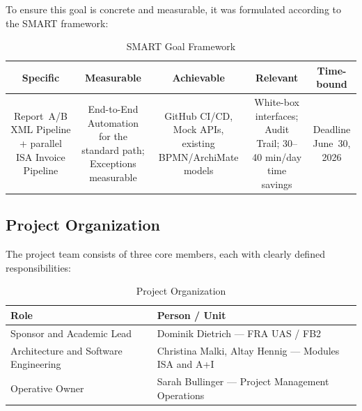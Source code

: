 \documentclass[11pt,a4paper]{article}
\begin{document}
To ensure this goal is concrete and measurable, it was formulated according to the SMART framework:

\begin{table}[ht]
\centering
\caption{SMART Goal Framework}
\begin{tabular}{@{}ccccc@{}}
\toprule
\textbf{Specific} & \textbf{Measurable} & \textbf{Achievable} & \textbf{Relevant} & \textbf{Time-bound} \\
\midrule
\begin{minipage}[t]{0.16\textwidth}\small Report~A/B XML Pipeline + parallel ISA Invoice Pipeline\end{minipage} &
\begin{minipage}[t]{0.16\textwidth}\small End-to-End Automation for the standard path; Exceptions measurable\end{minipage} &
\begin{minipage}[t]{0.16\textwidth}\small GitHub CI/CD, Mock APIs, existing BPMN/ArchiMate models\end{minipage} &
\begin{minipage}[t]{0.16\textwidth}\small White-box interfaces; Audit Trail; 30--40 min/day time savings\end{minipage} &
\begin{minipage}[t]{0.16\textwidth}\small Deadline June~30, 2026\end{minipage} \\
\bottomrule
\end{tabular}
\end{table}

\subsection{Project Organization}

The project team consists of three core members, each with clearly defined responsibilities:

\begin{table}[ht]
\centering
\caption{Project Organization}
\begin{tabular}{@{}p{}p{}@{}}
\toprule
\textbf{Role} & \textbf{Person / Unit} \\
\midrule
Sponsor and Academic Lead & Dominik Dietrich --- FRA UAS / FB2 \\
Architecture and Software Engineering & Christina Malki, Altay Hennig --- Modules ISA and A+I \\
Operative Owner & Sarah Bullinger --- Project Management Operations \\
\bottomrule
\end{tabular}
\end{table}
\end{document}
